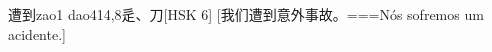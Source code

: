 \begin{EntryWithPhonetic}{遭到}{zao1 dao4}{14,8}{⾡、⼑}[HSK 6]
  [我们遭到意外事故。===Nós sofremos um acidente.]
\end{EntryWithPhonetic}
